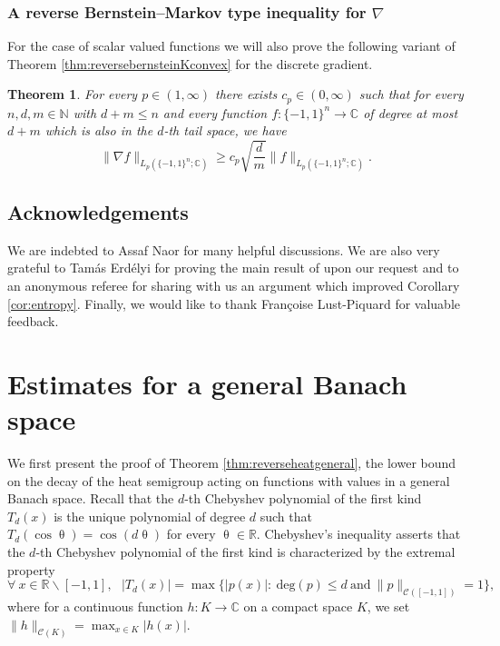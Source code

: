 \documentclass[11pt,reqno]{amsart}
\renewcommand{\leq}{\leqslant}
\renewcommand{\geq}{\geqslant}
\renewcommand{\setminus}{\smallsetminus}
\newcommand{\R}{\mathbb R}
\newcommand{\1}{\mathbf 1}
\newtheorem{theorem}{Theorem}
\theoremstyle{remark}
\newcommand{\C}{\mathbb C}
\newcommand{\N}{\mathbb N}
\renewcommand{\theta}{\uptheta}
\newcommand{\ms}{\mathscr}
\begin{document}
\subsubsection{A reverse Bernstein--Markov type inequality for $\nabla$} For the case of scalar valued functions we will also prove the following variant of Theorem \ref{thm:reversebernsteinKconvex} for the discrete gradient.

\begin{theorem} \label{thm:reversebernstein}
For every $p\in(1,\infty)$ there exists $c_p\in(0,\infty)$ such that for every $n,d,m\in\N$ with $d+m\leq n$ and every function $f:\{-1,1\}^n\to\C$ of degree at most $d+m$ which is also in the $d$-th tail space, we have
\begin{equation} \label{eq:reversegradient}
\|\nabla f\|_{L_p(\{-1,1\}^n;\C)} \geq c_p \sqrt{\frac{d}{m}} \|f\|_{L_p(\{-1,1\}^n;\C)}.
\end{equation}
\end{theorem}

\subsection*{Acknowledgements} We are indebted to Assaf Naor for many helpful discussions. We are also very grateful to Tam\'as Erd\'elyi for proving the main result of \cite{Erd18} upon our request and to an anonymous referee for sharing with us an argument which improved Corollary \ref{cor:entropy}. Finally, we would like to thank Françoise Lust-Piquard for valuable feedback.


\section{Estimates for a general Banach space} \label{sec:2}

We first present the proof of Theorem \ref{thm:reverseheatgeneral}, the lower bound on the decay of the heat semigroup acting on functions with values in a general Banach space. Recall that the $d$-th Chebyshev polynomial of the first kind $T_d(x)$ is the unique polynomial of degree $d$ such that $T_d(\cos \theta) = \cos(d\theta)$ for every $\theta\in\R$. Chebyshev's inequality \cite[p.~235]{BE95} asserts that the $d$-th Chebyshev polynomial of the first kind is characterized by the extremal property
\begin{equation} \label{eq:chebyshevineq}
\forall \ x\in\R\setminus[-1,1], \ \ \ |T_d(x)| = \max\big\{ |p(x)|: \ \mathrm{deg}(p) \leq d \ \mbox{and} \ \|p\|_{\ms{C}([-1,1])}=1 \big\},
\end{equation}
where for a continuous function $h:K\to\C$ on a compact space $K$, we set $\|h\|_{\ms{C}(K)} = \max_{x\in K} |h(x)|$.
\end{document}
